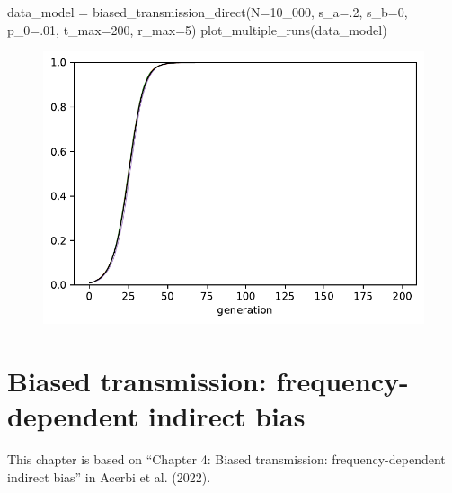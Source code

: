 \documentclass[
  a4paperpaper,
  ,captions=tableheading
]{scrbook}
\newenvironment{Shaded}{\begin{snugshade}}{\end{snugshade}}
\newcommand{\DecValTok}[1]{\textcolor[rgb]{0.68,0.00,0.00}{#1}}
\newcommand{\FloatTok}[1]{\textcolor[rgb]{0.68,0.00,0.00}{#1}}
\newcommand{\NormalTok}[1]{\textcolor[rgb]{0.00,0.23,0.31}{#1}}
\newcommand{\OperatorTok}[1]{\textcolor[rgb]{0.37,0.37,0.37}{#1}}
\begin{document}
\begin{Shaded}
\begin{Highlighting}[]
\NormalTok{data\_model }\OperatorTok{=}\NormalTok{ biased\_transmission\_direct(N}\OperatorTok{=}\DecValTok{10\_000}\NormalTok{, s\_a}\OperatorTok{=}\FloatTok{.2}\NormalTok{, s\_b}\OperatorTok{=}\DecValTok{0}\NormalTok{, }
\NormalTok{                                         p\_0}\OperatorTok{=}\FloatTok{.01}\NormalTok{, t\_max}\OperatorTok{=}\DecValTok{200}\NormalTok{, r\_max}\OperatorTok{=}\DecValTok{5}\NormalTok{)}
\NormalTok{plot\_multiple\_runs(data\_model)}
\end{Highlighting}
\end{Shaded}

\begin{figure}[H]

{\centering \includegraphics{chapter05_files/figure-pdf/cell-7-output-1.pdf}

}

\end{figure}

\hypertarget{sec-frequency-biased-transmission}{%
\chapter{Biased transmission: frequency-dependent indirect
bias}\label{sec-frequency-biased-transmission}}

\begin{tcolorbox}[enhanced jigsaw, arc=.35mm, colbacktitle=quarto-callout-note-color!10!white, colback=white, breakable, toprule=.15mm, title=\textcolor{quarto-callout-note-color}{\faInfo}\hspace{0.5em}{Note}, left=2mm, bottomtitle=1mm, toptitle=1mm, leftrule=.75mm, opacitybacktitle=0.6, titlerule=0mm, opacityback=0, rightrule=.15mm, bottomrule=.15mm, coltitle=black, colframe=quarto-callout-note-color-frame]

This chapter is based on ``Chapter 4: Biased transmission:
frequency-dependent indirect bias'' in Acerbi et al. (2022).

\end{tcolorbox}
\end{document}

